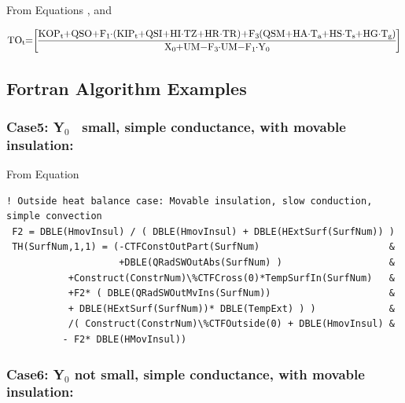 From Equations , and

\begin{equation}
\medmuskip=0mu
\thinmuskip=0mu
\thickmuskip=0mu
\nulldelimiterspace=0pt
\scriptspace=0pt
{\rm{T}}{{\rm{O}}_{\rm{t}}}{\rm{ = }}\left[ {\frac{{{\rm{KO}}{{\rm{P}}_{\rm{t}}} + {\rm{QSO}} + {{\rm{F}}_1}\cdot \left( {{\rm{KI}}{{\rm{P}}_{\rm{t}}}{\rm{ + QSI + HI}}\cdot {\rm{TZ + HR}}\cdot {\rm{TR}}} \right){\rm{ + }}{{\rm{F}}_{\rm{3}}}\left( {{\rm{QSM + HA}}\cdot {{\rm{T}}_{\rm{a}}}{\rm{ + HS}}\cdot {{\rm{T}}_{\rm{s}}}{\rm{ + HG}}\cdot {{\rm{T}}_{\rm{g}}}} \right)}}{{{{\rm{X}}_{\rm{0}}}{\rm{ + UM - }}{{\rm{F}}_{\rm{3}}}\cdot {\rm{UM - }}{{\rm{F}}_{\rm{1}}}\cdot {{\rm{Y}}_{\rm{0}}}}}} \right]{\rm{  }}
\end{equation}

\subsection{Fortran Algorithm Examples}\label{fortran-algorithm-examples}

\subsubsection{\texorpdfstring{Case5: Y\(_{0}\)~ small, simple conductance, with movable insulation:}{Case5: Y\_\{0\}~ small, simple conductance, with movable insulation:}}\label{case5-yux5f0-small-simple-conductance-with-movable-insulation-1}

From Equation

\begin{lstlisting}
! Outside heat balance case: Movable insulation, slow conduction, simple convection
 F2 = DBLE(HmovInsul) / ( DBLE(HmovInsul) + DBLE(HExtSurf(SurfNum)) )
 TH(SurfNum,1,1) = (-CTFConstOutPart(SurfNum)                       &
                    +DBLE(QRadSWOutAbs(SurfNum) )                   &
           +Construct(ConstrNum)\%CTFCross(0)*TempSurfIn(SurfNum)   &
           +F2* ( DBLE(QRadSWOutMvIns(SurfNum))                     &
           + DBLE(HExtSurf(SurfNum))* DBLE(TempExt) ) )             &
           /( Construct(ConstrNum)\%CTFOutside(0) + DBLE(HmovInsul) &
          - F2* DBLE(HMovInsul))
\end{lstlisting}

\subsubsection{\texorpdfstring{Case6: Y\(_{0}\) not small, simple conductance, with movable insulation:}{Case6: Y\_\{0\} not small, simple conductance, with movable insulation:}}\label{case6-yux5f0-not-small-simple-conductance-with-movable-insulation-1}

